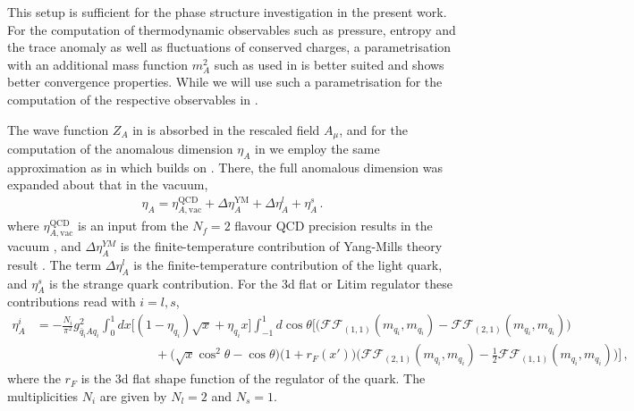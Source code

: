 \documentclass[reprint,twocolumn,superscriptaddress,preprintnumbers,amsmath,amssymb,aps,prd,floatfix]{revtex4-2}
\begin{document}
This setup is sufficient for the phase structure investigation in the present work. For the computation of thermodynamic observables such as pressure, entropy and the trace anomaly as well as fluctuations of conserved charges, a parametrisation with an additional mass function $m_A^2$ such as used in \cite{Pawlowski:2025jpg} is better suited and shows better convergence properties. While we will use such a parametrisation for the computation of the respective observables in \cite{Wen2026B-S}.  

The wave function $Z_A$ in 	 is absorbed in the rescaled field $A_\mu$, and for the computation of the anomalous dimension $\eta_A$ in  we employ the same approximation as in \cite{Fu:2019hdw} which builds on \cite{Braun:2014ata}. There, the full anomalous dimension was expanded about that in the vacuum,  
%
\begin{align}
	\eta_{A}=\eta_{A,\textrm{vac}}^{\textrm{QCD}}+\Delta \eta_A^{\textrm{YM}} + \Delta \eta_A^{l}+\eta_A^{s}\,.
\end{align}
%
where $\eta_{A,\textrm{vac}}^{\textrm{QCD}}$ is an input from the $N_f=2$ flavour QCD precision results in the vacuum \cite{Cyrol:2017ewj}, and $\Delta \eta_A^{YM}$ is the finite-temperature contribution of Yang-Mills theory result \cite{Cyrol:2017qkl}. The term $\Delta \eta_A^{l}$ is the finite-temperature contribution of the light quark, and $\eta_A^{s}$ is the strange quark contribution. For the 3d flat or Litim regulator these contributions read with $i=l,s$,  
%
\begin{align}\nonumber 
	\eta_{A}^{i}
	&=-\frac{N_i}{\pi^2} g_{{\bar q}_i  A q_i}^{2}\int_0^1 d x
	\bigg[(1-\eta_{q_i}) \sqrt x+\eta_{q_i} x\bigg] \int_{-1}^1 d \cos \theta\bigg[
	\Big(\mathcal{FF}_{(1,1)}(m_{q_i},m_{q_i})-\mathcal{FF}_{(2,1)}(m_{q_i},m_{q_i})\Big) \\[1ex]
	&\hspace{4cm}
	+\Big(\sqrt x \cos^2\!\theta-\cos \theta\Big) \Big(1+r_F(x')\Big)\Big(\mathcal{FF}_{(2,1)}(m_{q_i},
	m_{q_i})-\frac{1}{2}\mathcal{FF}_{(1,1)}(m_{q_i},m_{q_i})
	\Big)\bigg]\,,
\end{align}
%
where the $r_{F}$ is the 3d flat shape function of the regulator of the quark. The multiplicities $N_i$ are given by $N_l=2$ and $N_s=1$. 
\end{document}
